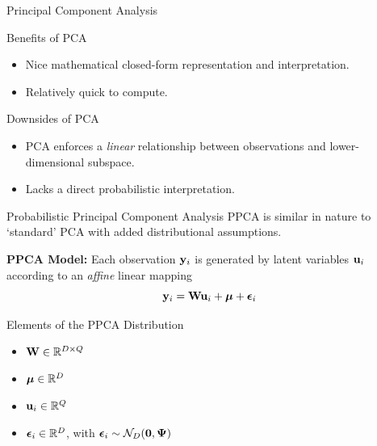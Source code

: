 \documentclass[dvipsnames]{beamer}
\begin{document}
\begin{frame}{Principal Component Analysis}
    \begin{exampleblock}{Benefits of PCA}
        \begin{itemize}[label=]
            \item Nice mathematical closed-form representation and interpretation.
            \item Relatively quick to compute.
        \end{itemize}
    \end{exampleblock}

    \bigskip

    \begin{alertblock}{Downsides of PCA}
        \begin{itemize}[label=]
            \item PCA enforces a \emph{linear} relationship between observations and lower-dimensional subspace.
            \item Lacks a direct probabilistic interpretation.
        \end{itemize}
    \end{alertblock}
\end{frame}

\begin{frame}{Probabilistic Principal Component Analysis}
    PPCA is similar in nature to `standard' PCA with added distributional assumptions.

    \bigskip

    \textbf{PPCA Model:} Each observation $\mathbf{y}_{i}$ is generated by latent variables $\mathbf{u}_{i}$ according to an \emph{affine} linear mapping 
    \begin{equation*}
        \mathbf{y}_{i} = \mathbf{W}\mathbf{u}_{i} + \bm{\mu} + \bm{\epsilon}_{i}
    \end{equation*}
    \vspace*{-1.5em}
    \begin{block}{Elements of the PPCA Distribution}
        \begin{itemize}[label=]
            \item $\mathbf{W} \in \mathbb{R}^{D \times Q}$ 
            \item $\bm{\mu} \in \mathbb{R}^{D}$
            \item $\mathbf{u}_{i} \in \mathbb{R}^{Q}$
            \item $\bm{\epsilon}_{i} \in \mathbb{R}^{D}$, with $\bm{\epsilon}_{i} \sim \mathcal{N}_{D}(\bm{0}, \bm{\Psi})$
        \end{itemize}
    \end{block}
\end{frame}
\end{document}
